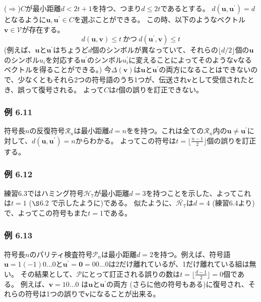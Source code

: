 \documentclass[12pt,a4paper]{article}
\begin{document}
($\Rightarrow$)$C$が最小距離$d < 2t + 1$を持つ、つまり$d \leq 2t$であるとする。
$d(\mathbf{u}, \mathbf{u}^\prime) = d$となるように$\mathbf{u}, \mathbf{u}^\prime \in C$を選ぶことができる。
この時、以下のようなベクトル$\mathbf{v} \in \mathcal{V}$が存在する。
$$
d(\mathbf{u}, \mathbf{v}) \leq t \ \text{かつ} \ d(\mathbf{u}^\prime, \mathbf{v}) \leq t
$$
(例えば、$\mathbf{u}$と$\mathbf{u}^\prime$はちょうど$d$個のシンボルが異なっていて、それらの$\lfloor d / 2 \rfloor$個の$\mathbf{u}$のシンボル$u_i$を対応する$\mathbf{u}^\prime$のシンボル$u^\prime_i$に変えることによってそのような$\mathbf{v}$なるベクトルを得ることができる。)
今$\Delta (\mathbf{v})$は$\mathbf{u}$と$\mathbf{u}^\prime$の両方になることはできないので、少なくともそれら2つの符号語のうち1つが、伝送され$\mathbf{v}$として受信されたとき、誤って復号される。
よって$C$は$t$個の誤りを訂正できない。

\subsubsection*{例 6.11}

符号長$n$の反復符号$\mathcal{R}_n$は最小距離$d=n$をを持つ。これは全ての$\mathcal{R}_n$内の$\mathbf{u} \neq \mathbf{u}^\prime$に対して、$d(\mathbf{u}, \mathbf{u}^\prime) = n$からわかる。
よってこの符号は$t = \lfloor \frac{n-1}{2} \rfloor$個の誤りを訂正する。

\subsubsection*{例 6.12}

練習6.3ではハミング符号$\mathcal{H}_7$が最小距離$d=3$を持つことを示した、よってこれは$t=1$ ($\S$6.2 で示したように)である。
似たように、$\bar{\mathcal{H}_7}$は$d=4$ (練習6.4より)で、よってこの符号もまた$t=1$である。

\subsubsection*{例 6.13}

符号長$n$のパリティ検査符号$\mathcal{P}_n$は最小距離$d=2$を持つ。例えば、符号語$\mathbf{u} = 1(-1)0\dots 0$と$\mathbf{u}^\prime = \mathbf{0} = 00 \dots 0$は2だけ離れているが、1だけ離れている組は無い。
その結果として、$\mathcal{P}$にとって訂正される誤りの数は$t = \lfloor \frac{d-1}{2} \rfloor = 0$個である。
例えば、$\mathbf{v} = 10 \dots 0$ は$\mathbf{u}$と$\mathbf{u}^\prime$の両方 (さらに他の符号もある)に復号され、それらの符号は1つの誤りで$\mathbf{v}$になることが出来る。
\end{document}
